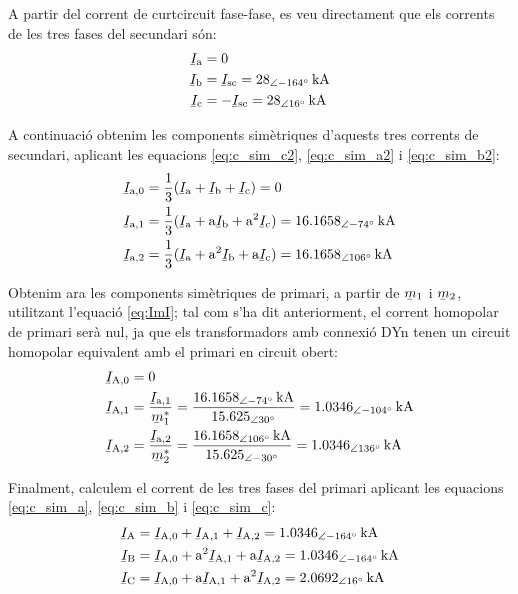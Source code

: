 \begin{exemple}[\CCasimSecTrafo{}]
    \begin{center}
       
    \end{center}

    A partir del corrent de curtcircuit fase-fase, es veu directament que els corrents de les tres fases del secundari són:
    \begin{align*}
        \cmplx{I}\ped{a} &= 0  \\
        \cmplx{I}\ped{b} &= \cmplx{I}\ped{sc} = \qtypd{28}{-164}{kA}  \\
        \cmplx{I}\ped{c} &= -\cmplx{I}\ped{sc} = \qtypd{28}{16}{kA}
    \end{align*}

    A continuació obtenim les components simètriques d'aquests tres corrents de secundari, aplicant les equacions \eqref{eq:c_sim_c2}, \eqref{eq:c_sim_a2} i \eqref{eq:c_sim_b2}:
    \begin{align*}
        \cmplx{I}\ped{a,0} &= \frac{1}{3} (\cmplx{I}\ped{a} + \cmplx{I}\ped{b} +
        \cmplx{I}\ped{c}) = 0 \\
        \cmplx{I}\ped{a,1} &= \frac{1}{3} (\cmplx{I}\ped{a} + \au \cmplx{I}\ped{b} +
         \au^2 \cmplx{I}\ped{c}) = \qtypd{16,1658}{-74}{kA}  \\
        \cmplx{I}\ped{a,2} &= \frac{1}{3} (\cmplx{I}\ped{a} + \au^2 \cmplx{I}\ped{b} +
         \au \cmplx{I}\ped{c}) = \qtypd{16,1658}{106}{kA}
    \end{align*}

    Obtenim ara les components simètriques de primari, a partir de $\cmplx{m}_1$ i $\cmplx{m}_2$, utilitzant l'equació \eqref{eq:ImI}; tal com s'ha dit anteriorment, el corrent homopolar de primari serà nul, ja que els transformadors amb connexió DYn tenen un circuit homopolar equivalent amb el primari en circuit obert:
    \begin{align*}
        \cmplx{I}\ped{A,0} &= 0 \\
        \cmplx{I}\ped{A,1} &= \frac{\cmplx{I}\ped{a,1}}{\cmplx{m}^*_1} = \frac{\qtypd{16,1658}{-74}{kA}}{\numpd{15,625}{30}} =  \qtypd{1,0346}{-104}{kA} \\
        \cmplx{I}\ped{A,2} &= \frac{\cmplx{I}\ped{a,2}}{\cmplx{m}^*_2} = \frac{\qtypd{16,1658}{106}{kA}}{\numpd{15,625}{-30}} = \qtypd{1,0346}{136}{kA}
    \end{align*}

    Finalment, calculem el corrent de les tres fases del primari aplicant les equacions \eqref{eq:c_sim_a}, \eqref{eq:c_sim_b} i \eqref{eq:c_sim_c}:
     \begin{align*}
        \cmplx{I}\ped{A} &= \cmplx{I}\ped{A,0} + \cmplx{I}\ped{A,1} + \cmplx{I}\ped{A,2} = \qtypd{1,0346}{-164}{kA} \\
        \cmplx{I}\ped{B} &= \cmplx{I}\ped{A,0} + \au^2 \cmplx{I}\ped{A,1} + \au \cmplx{I}\ped{A,2} = \qtypd{1,0346}{-164}{kA} \\
        \cmplx{I}\ped{C} &= \cmplx{I}\ped{A,0} + \au \cmplx{I}\ped{A,1} + \au^2 \cmplx{I}\ped{A,2} = \qtypd{2,0692}{16}{kA}
    \end{align*}


\end{exemple}
